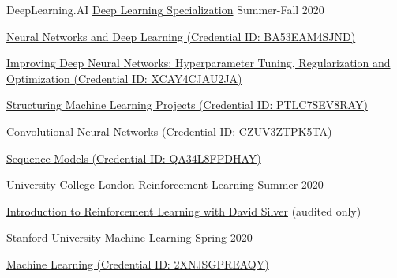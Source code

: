 \begin{cventries}
  \cventry
    {DeepLearning.AI} %
    {\href{https://www.coursera.org/account/accomplishments/specialization/certificate/3DWHZC46YSCK}{Deep Learning Specialization}} %
    {} %
    {Summer-Fall 2020} %
    {
      \begin{cvitems} %
      	\item {\href{https://www.coursera.org/account/accomplishments/certificate/BA53EAM4SJND}{Neural Networks and Deep Learning (Credential ID: BA53EAM4SJND)}}
      	\item {\href{https://www.coursera.org/account/accomplishments/certificate/XCAY4CJAU2JA}{Improving Deep Neural Networks: Hyperparameter Tuning, Regularization and Optimization (Credential ID: XCAY4CJAU2JA)}}
      	\item {\href{https://www.coursera.org/account/accomplishments/certificate/PTLC7SEV8RAY}{Structuring Machine Learning Projects (Credential ID: PTLC7SEV8RAY)}}
      	\item {\href{https://www.coursera.org/account/accomplishments/certificate/CZUV3ZTPK5TA}{Convolutional Neural Networks (Credential ID: CZUV3ZTPK5TA)}}
      	\item {\href{https://www.coursera.org/account/accomplishments/certificate/QA34L8FPDHAY}{Sequence Models (Credential ID: QA34L8FPDHAY)}}
      \end{cvitems}
    }

  \cventry
    {University College London} %
    {Reinforcement Learning} %
    {} %
    {Summer 2020} %
    {
      \begin{cvitems} %
      	\item {\href{https://www.youtube.com/watch?v=2pWv7GOvuf0&list=PLqYmG7hTraZBiG_XpjnPrSNw-1XQaM_gB}{Introduction to Reinforcement Learning with David Silver} (audited only)}
      \end{cvitems}
    }

  \cventry
    {Stanford University} %
    {Machine Learning} %
    {} %
    {Spring 2020} %
    {
      \begin{cvitems} %
      	\item {\href{https://www.coursera.org/account/accomplishments/certificate/2XNJSGPREAQY}{Machine Learning (Credential ID: 2XNJSGPREAQY)}}
      \end{cvitems}
    }
    
\end{cventries}
